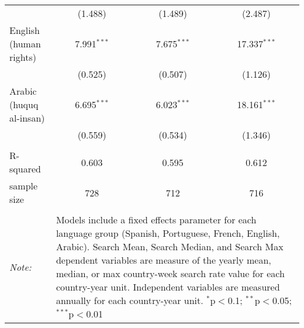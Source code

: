 \begin{table}[!htbp]
\begin{tabular}{@{\extracolsep{5pt}}lccc}
  & (1.488) & (1.489) & (2.487) \\ 
  English (human rights) & 7.991$^{***}$ & 7.675$^{***}$ & 17.337$^{***}$ \\ 
  & (0.525) & (0.507) & (1.126) \\ 
  Arabic (huquq al-insan) & 6.695$^{***}$ & 6.023$^{***}$ & 18.161$^{***}$ \\ 
  & (0.559) & (0.534) & (1.346) \\ 
 \hline \\[-1.8ex] 
R-squared  & 0.603 & 0.595 & 0.612 \\ 
sample size  & 728 & 712 & 716 \\ 
\hline 
\hline \\[-1.8ex] 
\textit{Note:}  & \multicolumn{3}{l}{\parbox[t]{8cm}{Models include a fixed effects parameter for each language group (Spanish, Portuguese, French, English, Arabic). Search Mean, Search Median, and Search Max dependent variables are measure of the yearly mean, median, or max country-week search rate value for each country-year unit. Independent variables are measured annually for each country-year unit. $^{*}$p$<$0.1; $^{**}$p$<$0.05; $^{***}$p$<$0.01}} \\ 
\end{tabular} 
\end{table} 
